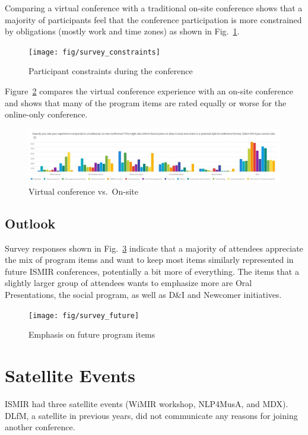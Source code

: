 \documentclass[%
10pt,								%
titlepage,						%
]
{scrartcl}
\begin{document}
        Comparing a virtual conference with a traditional on-site conference shows that a majority of participants feel that the conference participation is more constrained by obligations (mostly work and time zones) as shown in Fig.~\ref{fig:survey_constraints}.
         \begin{figure}%
            \centering
            \texttt{[image: fig/survey\_constraints]}%
            \caption{Participant constraints during the conference}%
            \label{fig:survey_constraints}%
        \end{figure}
        
        Figure~\ref{fig:survey_onsite} compares the virtual conference experience with an on-site conference and shows that many of the program items are rated equally or worse for the online-only conference.
          \begin{figure}%
            \centering
            \includegraphics[scale=.8]{fig/survey_onsite}%
            \caption{Virtual conference vs.\ On-site}%
            \label{fig:survey_onsite}%
        \end{figure}

    \subsection{Outlook}
        Survey responses shown in Fig.~\ref{fig:survey_future} indicate that a majority of attendees appreciate the mix of program items and want to keep most items similarly represented in future ISMIR conferences, potentially a bit more of everything. The items that a slightly larger group of attendees wants to emphasize more are Oral Presentations, the social program, as well as D\&I and Newcomer initiatives.
          \begin{figure}%
            \centering
            \texttt{[image: fig/survey\_future]}%
            \caption{Emphasis on future program items}%
            \label{fig:survey_future}%
        \end{figure}

\section{Satellite Events}
    ISMIR had three satellite events (WiMIR workshop, NLP4MusA, and MDX). DLfM, a satellite in previous years, did not communicate any reasons for joining another conference.
\end{document}
